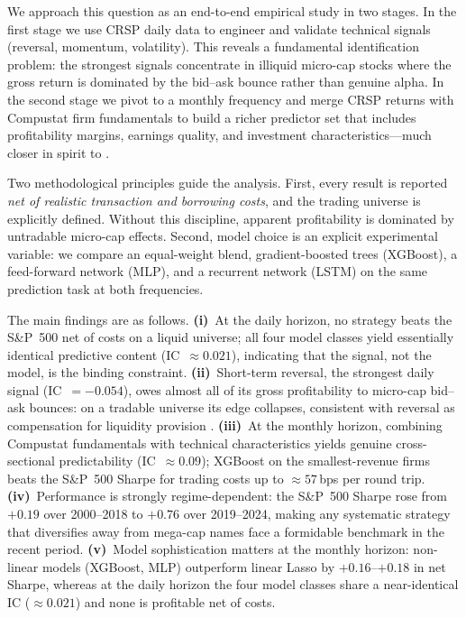 \documentclass[11pt,a4paper]{article}
\begin{document}
We approach this question as an end-to-end empirical study in two stages. In
the first stage we use CRSP daily data to engineer and validate technical
signals (reversal, momentum, volatility). This reveals a fundamental
identification problem: the strongest signals concentrate in illiquid micro-cap
stocks where the gross return is dominated by the bid--ask bounce rather than
genuine alpha. In the second stage we pivot to a monthly frequency and merge
CRSP returns with Compustat firm fundamentals to build a richer predictor set
that includes profitability margins, earnings quality, and investment
characteristics---much closer in spirit to \citet{gu2020}.

Two methodological principles guide the analysis. First, every result is
reported \emph{net of realistic transaction and borrowing costs}, and the
trading universe is explicitly defined. Without this discipline, apparent
profitability is dominated by untradable micro-cap effects. Second, model
choice is an explicit experimental variable: we compare an equal-weight blend,
gradient-boosted trees (XGBoost), a feed-forward network (MLP), and a
recurrent network (LSTM) on the same prediction task at both frequencies.

The main findings are as follows. \textbf{(i)}~At the daily horizon, no
strategy beats the S\&P~500 net of costs on a liquid universe; all four model
classes yield essentially identical predictive content (IC~$\approx 0.021$),
indicating that the signal, not the model, is the binding constraint.
\textbf{(ii)}~Short-term reversal, the strongest daily signal
(IC~$={-}0.054$), owes almost all of its gross profitability to micro-cap
bid--ask bounces: on a tradable universe its edge collapses, consistent with
reversal as compensation for liquidity provision \citep{nagel2012}.
\textbf{(iii)}~At the monthly horizon, combining Compustat fundamentals with
technical characteristics yields genuine cross-sectional predictability
(IC~$\approx 0.09$); XGBoost on the smallest-revenue firms beats the S\&P~500
Sharpe for trading costs up to $\approx 57$\,bps per round trip.
\textbf{(iv)}~Performance is strongly regime-dependent: the S\&P~500 Sharpe
rose from $+0.19$ over 2000--2018 to $+0.76$ over 2019--2024, making any
systematic strategy that diversifies away from mega-cap names face a formidable
benchmark in the recent period. \textbf{(v)}~Model sophistication matters at
the monthly horizon: non-linear models (XGBoost, MLP) outperform linear Lasso
by $+0.16$--$+0.18$ in net Sharpe, whereas at the daily horizon the four model
classes share a near-identical IC ($\approx 0.021$) and none is profitable net
of costs.
\end{document}
